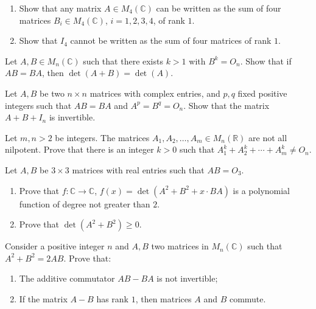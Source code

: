 \documentclass[12pt]{article}
\begin{document}
\begin{problem}
\begin{enumerate}[label=(\alph*)]
\item Show that any matrix $A\in M_4(\mathbb{C})$ can be written as the sum of four matrices $B_i\in M_4(\mathbb{C})$, $i=1,2,3,4$, of rank $1$.
\item Show that $I_4$ cannot be written as the sum of four matrices of rank $1$.
\end{enumerate}
\end{problem}

\begin{problem}
Let $A,B\in M_n(\mathbb{C})$ such that there exists $k>1$ with $B^k=O_n$. Show that if $AB=BA$, then $\det(A+B)=\det(A)$.
\end{problem}

\begin{problem}
Let $A,B$ be two $n\times n$ matrices with complex entries, and $p,q$ fixed positive integers such that $AB=BA$ and $A^p=B^q=O_n$. Show that the matrix $A+B+I_n$ is invertible.
\end{problem}

\begin{problem}
Let $m,n>2$ be integers. The matrices $A_1,A_2,\dots,A_m\in M_n(\mathbb{R})$ are not all nilpotent. Prove that there is an integer $k>0$ such that $A_1^k+A_2^k+\cdots+A_m^k \ne O_n$.
\end{problem}

\begin{problem}
Let $A,B$ be $3\times 3$ matrices with real entries such that $AB=O_3$.
\begin{enumerate}[label=(\alph*)]
\item Prove that $f:\mathbb{C}\to\mathbb{C}$, $f(x)=\det(A^2+B^2+x\cdot BA)$ is a polynomial function of degree not greater than $2$.
\item Prove that $\det(A^2+B^2)\ge 0$.
\end{enumerate}
\end{problem}

\begin{problem}
Consider a positive integer $n$ and $A,B$ two matrices in $M_n(\mathbb{C})$ such that $A^2+B^2=2AB$. Prove that:
\begin{enumerate}[label=(\alph*)]
\item The additive commutator $AB-BA$ is not invertible;
\item If the matrix $A-B$ has rank $1$, then matrices $A$ and $B$ commute.
\end{enumerate}
\end{problem}
\end{document}

